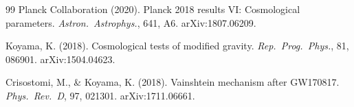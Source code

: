 \documentclass[12pt,a4paper]{article}
\begin{document}
\begin{thebibliography}{99}
  Planck Collaboration (2020).
  Planck 2018 results VI: Cosmological parameters.
  \textit{Astron.\ Astrophys.}, 641, A6.
  arXiv:1807.06209.

  Koyama, K. (2018).
  Cosmological tests of modified gravity.
  \textit{Rep.\ Prog.\ Phys.}, 81, 086901.
  arXiv:1504.04623.

  Crisostomi, M., \& Koyama, K. (2018).
  Vainshtein mechanism after GW170817.
  \textit{Phys.\ Rev.\ D}, 97, 021301.
  arXiv:1711.06661.

\end{thebibliography}
\end{document}
